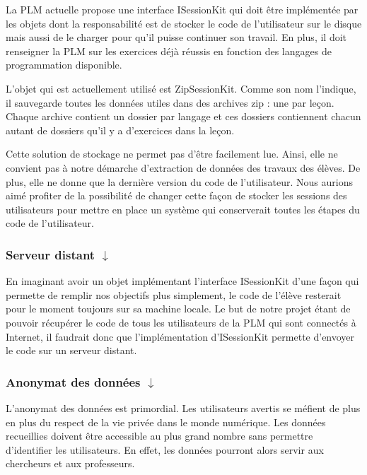 La PLM actuelle propose une interface ISessionKit qui doit être implémentée par les objets dont la responsabilité est de stocker le code de l'utilisateur sur le disque mais aussi de le charger pour qu'il puisse continuer son travail. En plus, il doit renseigner la PLM sur les exercices déjà réussis en fonction des langages de programmation disponible.

L'objet qui est actuellement utilisé est ZipSessionKit. Comme son nom l'indique, il sauvegarde toutes les données utiles dans des archives zip : une par leçon. Chaque archive contient un dossier par langage et ces dossiers contiennent chacun autant de dossiers qu'il y a d'exercices dans la leçon.

Cette solution de stockage ne permet pas d'être facilement lue. Ainsi, elle ne convient pas à notre démarche d'extraction de données des travaux des élèves. De plus, elle ne donne que la dernière version du code de l'utilisateur. Nous aurions aimé profiter de la possibilité de changer cette façon de stocker les sessions des utilisateurs pour mettre en place un système qui conserverait toutes les étapes du code de l'utilisateur.

\subsubsection[Serveur distant]{Serveur distant \hyperref[serveurDistantSol]{$\downarrow$}}
\label{serveurDistantPb}

En imaginant avoir un objet implémentant l'interface ISessionKit d'une façon qui permette de remplir nos objectifs plus simplement, le code de l'élève resterait pour le moment toujours sur sa machine locale. Le but de notre projet étant de pouvoir récupérer le code de tous les utilisateurs de la PLM qui sont connectés à Internet, il faudrait donc que l'implémentation d'ISessionKit permette d'envoyer le code sur un serveur distant.

\subsubsection[Anonymat des données]{Anonymat des données \hyperref[anonymatSol]{$\downarrow$}}
\label{anonymatPb}

L'anonymat des données est primordial. Les utilisateurs avertis se méfient de plus en plus du respect de la vie privée dans le monde numérique. Les données recueillies doivent être accessible au plus grand nombre sans permettre d'identifier les utilisateurs. En effet, les données pourront alors servir aux chercheurs et aux professeurs.

